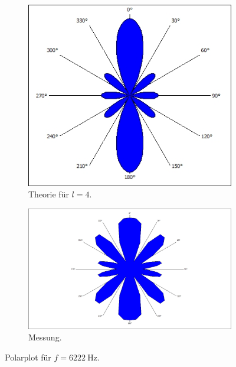 \begin{figure}
    \centering
    \begin{subfigure}[b]{0.475\textwidth}
        \centering
        \begin{minipage}{\textwidth}\includegraphics[width=\textwidth]{ressources/l4.jpg}\end{minipage}
        \caption[]%
        {{\small Theorie für $l=4$.}}
        \label{fig:2_13a}
    \end{subfigure}
    \hfill
    \begin{subfigure}[b]{0.475\textwidth}
        \centering
        \begin{minipage}{\textwidth}\includegraphics[width=\textwidth]{messdaten/2_3_6222.jpg}\end{minipage}
        \caption[]%
        {{\small Messung.}}
        \label{fig:2_13b}
    \end{subfigure}
    \caption[]
    {Polarplot für $f=\SI{6222}{\hertz}$.}
    \label{fig:2_13}
\end{figure}

